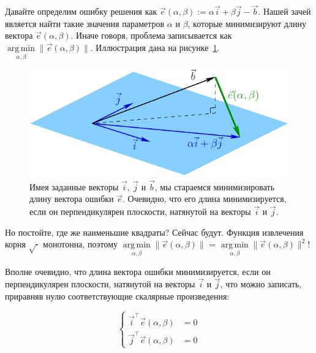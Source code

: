 \documentclass[notitlepage]{report}
\DeclareMathOperator*{\argmin}{arg\,min}
\begin{document}
Давайте определим ошибку решения как $\vec{e}(\alpha, \beta) :=  \alpha \vec{i} + \beta\vec{j} - \vec b$.
Нашей зачей является найти такие значения параметров $\alpha$ и $\beta$, которые минимизируют длину вектора $\vec{e}(\alpha, \beta)$. Иначе говоря, проблема записывается как $\argmin\limits_{\alpha, \beta} \|\vec{e}(\alpha, \beta)\|$.
Иллюстрация дана на рисунке~\ref{fig:error}.

\begin{figure}[ht]
	\centering
	\includegraphics[width=.7\linewidth]{error.pdf}
	\caption{Имея заданные векторы $\vec i$, $\vec j$ и $\vec b$, мы стараемся минимизировать длину вектора ошибки $\vec e$. Очевидно, что его длина минимизируется, если он перпендикулярен плоскости, натянутой на векторы $\vec i$ и $\vec j$.}
	\label{fig:error}
\end{figure}

Но постойте, где же наименьшие квадраты? Сейчас будут. Функция извлечения корня $\sqrt{\cdot}$ монотонна, поэтому $\argmin\limits_{\alpha, \beta} \|\vec{e}(\alpha, \beta)\|$ = $\argmin\limits_{\alpha, \beta} \|\vec{e}(\alpha, \beta)\|^2$!

Вполне очевидно, что длина вектора ошибки минимизируется, если он перпендикулярен плоскости, натянутой на векторы $\vec i$ и $\vec j$, что можно записать, приравняв нулю соответствующие скалярные произведения:

$$
\left\{
\begin{split}\vec{i}^\top \vec{e}(\alpha, \beta) &= 0\\
\vec{j}^\top \vec{e}(\alpha, \beta) &= 0
\end{split}
\right.
$$
\end{document}
